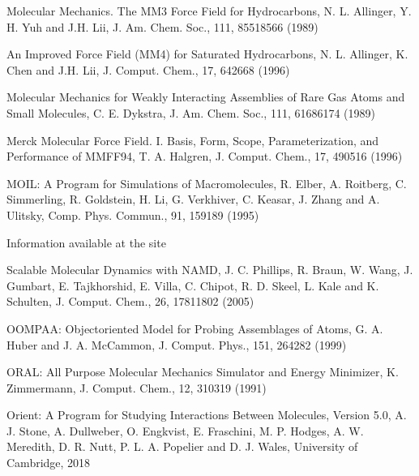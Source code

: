 \documentclass[letterpaper,11pt,english]{sphinxmanual}
\begin{document}

Molecular Mechanics. The MM3 Force Field for Hydrocarbons, N. L. Allinger, Y. H. Yuh and J.\sphinxhyphen{}H. Lii, J. Am. Chem. Soc., 111, 8551\sphinxhyphen{}8566 (1989)


An Improved Force Field (MM4) for Saturated Hydrocarbons, N. L. Allinger, K. Chen and J.\sphinxhyphen{}H. Lii, J. Comput. Chem., 17, 642\sphinxhyphen{}668 (1996)


Molecular Mechanics for Weakly Interacting Assemblies of Rare Gas Atoms and Small Molecules, C. E. Dykstra, J. Am. Chem. Soc., 111, 6168\sphinxhyphen{}6174 (1989)


Merck Molecular Force Field. I. Basis, Form, Scope, Parameterization, and Performance of MMFF94, T. A. Halgren, J. Comput. Chem., 17, 490\sphinxhyphen{}516 (1996)


MOIL: A Program for Simulations of Macromolecules, R. Elber, A. Roitberg, C. Simmerling, R. Goldstein, H. Li, G. Verkhiver, C. Keasar, J. Zhang and A. Ulitsky, Comp. Phys. Commun., 91, 159\sphinxhyphen{}189 (1995)


Information available at the site 


Scalable Molecular Dynamics with NAMD, J. C. Phillips, R. Braun, W. Wang, J. Gumbart, E. Tajkhorshid, E. Villa, C. Chipot, R. D. Skeel, L. Kale and K. Schulten, J. Comput. Chem., 26, 1781\sphinxhyphen{}1802 (2005)


OOMPAA: Object\sphinxhyphen{}oriented Model for Probing Assemblages of Atoms, G. A. Huber and J. A. McCammon, J. Comput. Phys., 151, 264\sphinxhyphen{}282 (1999)


ORAL: All Purpose Molecular Mechanics Simulator and Energy Minimizer, K. Zimmermann, J. Comput. Chem., 12, 310\sphinxhyphen{}319 (1991)


Orient: A Program for Studying Interactions Between Molecules, Version 5.0, A. J. Stone, A. Dullweber, O. Engkvist, E. Fraschini, M. P. Hodges, A. W. Meredith, D. R. Nutt, P. L. A. Popelier and D. J. Wales, University of Cambridge, 2018
\end{document}
